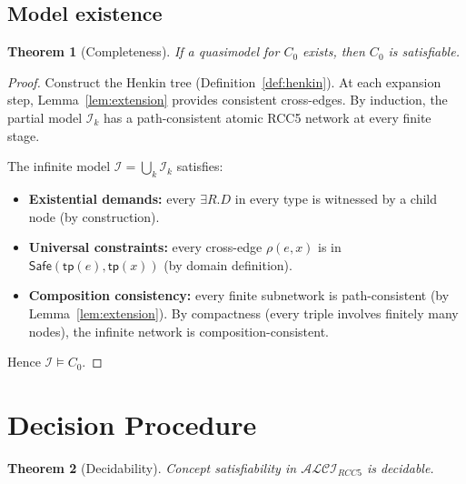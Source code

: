 \documentclass[a4paper,11pt]{article}
\newtheorem{theorem}{Theorem}[section]
\theoremstyle{definition}
\newcommand{\ALCIRCC}[1]{\ensuremath{\mathcal{ALCI}_{\mathit{RCC#1}}}}
\newcommand{\interp}{\ensuremath{\mathcal{I}}}
\newcommand{\tp}{\ensuremath{\mathsf{tp}}}
\newcommand{\Safe}{\ensuremath{\mathsf{Safe}}}
\begin{document}
\subsection{Model existence}

\begin{theorem}[Completeness]
\label{thm:completeness}
If a quasimodel for $C_0$ exists, then $C_0$ is satisfiable.
\end{theorem}

\begin{proof}
Construct the Henkin tree (Definition~\ref{def:henkin}).
At each expansion step, Lemma~\ref{lem:extension} provides
consistent cross-edges.  By induction, the partial model
$\interp_k$ has a path-consistent atomic RCC5 network at
every finite stage.

The infinite model $\interp = \bigcup_k \interp_k$ satisfies:
\begin{itemize}[nosep]
  \item \textbf{Existential demands:}\; every $\exists R.D$
    in every type is witnessed by a child node (by construction).
  \item \textbf{Universal constraints:}\; every cross-edge
    $\rho(e, x)$ is in $\Safe(\tp(e), \tp(x))$ (by
    domain definition).
  \item \textbf{Composition consistency:}\; every finite
    subnetwork is path-consistent (by
    Lemma~\ref{lem:extension}).  By compactness (every
    triple involves finitely many nodes), the infinite
    network is composition-consistent.
\end{itemize}
Hence $\interp \models C_0$.
\end{proof}


\section{Decision Procedure}
\label{sec:algorithm}

\begin{theorem}[Decidability]
\label{thm:decidability}
Concept satisfiability in $\ALCIRCC{5}$ is decidable.
\end{theorem}
\end{document}
